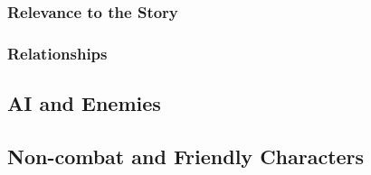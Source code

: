 \documentclass[12pt]{article}
\begin{document}
\subsubsection{Relevance to the Story}

\subsubsection{Relationships}

\subsection{AI and Enemies}

\subsection{Non-combat and Friendly Characters}





\end{document}

